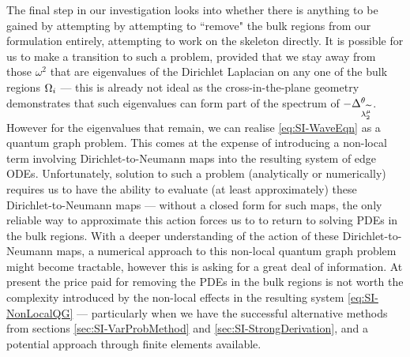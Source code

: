 The final step in our investigation looks into whether there is anything to be gained by attempting by attempting to ``remove" the bulk regions from our formulation entirely, attempting to work on the skeleton directly.
It is possible for us to make a transition to such a problem, provided that we stay away from those $\omega^2$ that are eigenvalues of the Dirichlet Laplacian on any one of the bulk regions $\Omega_i$ --- this is already not ideal as the cross-in-the-plane geometry demonstrates that such eigenvalues can form part of the spectrum of $-\Delta_{\lambda_2^{\widetilde{\mu}}}^\theta$.
However for the eigenvalues that remain, we can realise \eqref{eq:SI-WaveEqn} as a quantum graph problem.
This comes at the expense of introducing a non-local term involving Dirichlet-to-Neumann maps into the resulting system of edge ODEs.
Unfortunately, solution to such a problem (analytically or numerically) requires us to have the ability to evaluate (at least approximately) these Dirichlet-to-Neumann maps --- without a closed form for such maps, the only reliable way to approximate this action forces us to to return to solving PDEs in the bulk regions.
With a deeper understanding of the action of these Dirichlet-to-Neumann maps, a numerical approach to this non-local quantum graph problem might become tractable, however this is asking for a great deal of information.
At present the price paid for removing the PDEs in the bulk regions is not worth the complexity introduced by the non-local effects in the resulting system \eqref{eq:SI-NonLocalQG} --- particularly when we have the successful alternative methods from sections \ref{sec:SI-VarProbMethod} and \ref{sec:SI-StrongDerivation}, and a potential approach through finite elements available.


